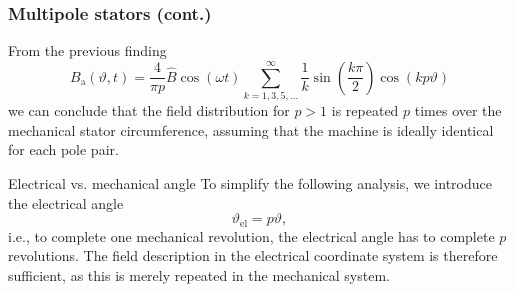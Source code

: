 \begin{frame}
	\frametitle{Multipole stators (cont.)}
        From  the previous finding
        \begin{equation*}
                B_\mathrm{a}(\vartheta, t) = \frac{4}{\pi p} \hat{B} \cos(\omega t)\sum_{k=1,3,5,\ldots}^{\infty}   \frac{1}{k}\sin(\frac{k \pi}{2}) \cos(k p \vartheta)
        \end{equation*}
        we can conclude that the field distribution for $p > 1$ is repeated $p$ times over the mechanical stator circumference, assuming that the  machine is ideally identical for each pole pair. 
        \begin{varblock}{Electrical vs. mechanical angle}
            To simplify the following analysis, we introduce the electrical angle 
            \begin{equation}
                \vartheta_\mathrm{el} = p \vartheta,
            \end{equation}
           i.e., to complete one mechanical revolution, the electrical angle has to complete $p$ revolutions. The field description in the electrical coordinate system is therefore sufficient, as this is merely repeated in the mechanical system.
        \end{varblock}
\end{frame}

